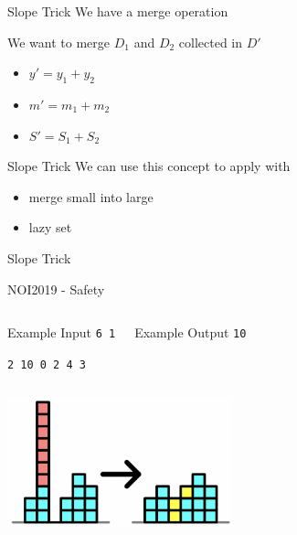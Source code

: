 \documentclass[aspectratio=169,xcolor=dvipsnames]{beamer}
\begin{document}
\begin{frame}[t, plain]{Slope Trick}
We have a merge operation
\pause
\begin{examples}
We want to merge $D_1$ and $D_2$ collected in $D'$
\pause
\begin{itemize}
    \item $y' = y_1 + y_2$
    \pause 
    \item $m' = m_1 + m_2$
    \pause
    \item $S' = S_1 + S_2$
\end{itemize}
\end{examples}
\end{frame}

\begin{frame}[t, plain]{Slope Trick}
We can use this concept to apply with
\pause
\begin{itemize}
    \item merge small into large
    \pause
    \item lazy set
\end{itemize}

\end{frame}

\begin{frame}[t, plain]{Slope Trick}
\begin{Large}
NOI2019 - Safety
\end{Large}
\begin{columns}[c] %

        \begin{alertblock}{Example Input}
\texttt{6 1}

\texttt{2 10 0 2 4 3}
\end{alertblock}
        \begin{alertblock}{Example Output}
\texttt{10}

\texttt{}
\end{alertblock}
\end{columns}

\begin{center}
\includegraphics[width=6.5cm]{safety.png}
\end{center}

\end{frame}
\end{document}
